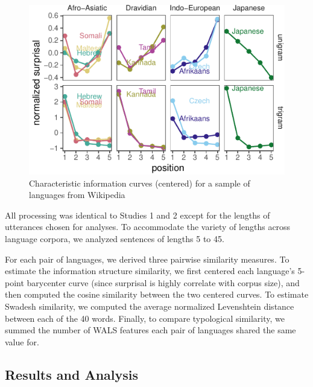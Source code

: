 \documentclass[man,floatsintext]{apa6}
\begin{document}
\begin{figure}
\centering
\includegraphics{figs/diff-languages-1.pdf}
\caption{\label{fig:diff-languages}Characteristic information curves (centered) for a sample of languages from Wikipedia}
\end{figure}

All processing was identical to Studies 1 and 2 except for the lengths of utterances chosen for analyses. To accommodate the variety of lengths across language corpora, we analyzed sentences of lengths 5 to 45.

For each pair of languages, we derived three pairwise similarity measures. To estimate the information structure similarity, we first centered each language's 5-point barycenter curve (since surprisal is highly correlate with corpus size), and then computed the cosine similarity between the two centered curves. To estimate Swadesh similarity, we computed the average normalized Levenshtein distance between each of the 40 words. Finally, to compare typological similarity, we summed the number of WALS features each pair of languages shared the same value for.

\hypertarget{results-and-analysis}{%
\subsection{Results and Analysis}\label{results-and-analysis}}
\end{document}
